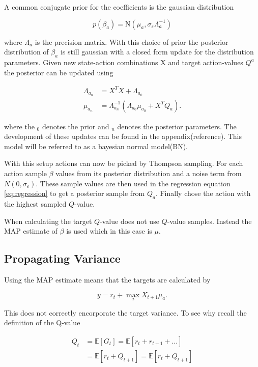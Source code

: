 A common conjugate prior for the coefficients is the gaussian distribution 

$$
p(\beta_a) = \text{N}(\mu_a, \sigma_\varepsilon\Lambda_a^{-1}) 
$$

where $\Lambda_a$ is the precision matrix. With this choice of prior the posterior distribution of $\beta_a$ is still gaussian with a closed form update for the distribution parameters. Given new state-action combinations X and target action-values $Q^a$ the posterior can be updated using 

\begin{equation}
    \begin{split}
        \label{eq:known_noise_posterior_update}
        \Lambda_{a_n} & = X^TX + \Lambda_{a_0} \\
        \mu_{a_n}     & = \Lambda_{a_n}^{-1}(\Lambda_{a_0}\mu_{a_0} + X^TQ_a).
    \end{split}
\end{equation}

where the $_0$ denotes the prior and $_n$ denotes the posterior parameters. The development of these updates can be found in the appendix(\todo reference). This model will be referred to as a bayesian normal model(BN).

With this setup actions can now be picked by Thompson sampling. For each action sample $\beta$ values from its posterior distribution and a noise term from $N(0, \sigma_\varepsilon)$. These sample values are then used in the regression equation \ref{eq:regression} to get a posterior sample from $Q_a$. Finally chose the action with the highest sampled $Q$-value. 

When calculating the target $Q$-value \cite{azziz_2018} does not use $Q$-value samples. Instead the MAP estimate of $\beta$ is used which in this case is $\mu$.


\subsection{Propagating Variance}

Using the MAP estimate means that the targets are calculated by 

$$
y = r_t + \max_a X_{t+1}\mu_a.
$$

This does not correctly encorporate the target variance. To see why recall the definition of the Q-value

\begin{align*}
    Q_t &= \mathbb{E}[G_t] = \mathbb{E}[r_t + r_{t+1} + \dots] \\
    &= \mathbb{E}[r_t + Q_{t+1}] = \mathbb{E}[r_t + Q_{t+1}]
\end{align*}

